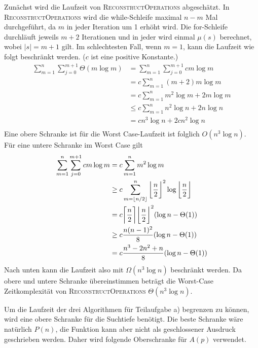 \documentclass[a4paper, 11pt, ngerman]{article}
\begin{document}
Zunächst wird die Laufzeit von \textsc{ReconstructOperations} abgeschätzt. In \textsc{ReconstructOperations} wird die while-Schleife maximal $n - m$ Mal durchgeführt, da $m$ in jeder Iteration um 1 erhöht wird. Die for-Schleife durchläuft jeweils $m + 2$ Iterationen und in jeder wird einmal $\mu(s)$ berechnet, wobei $|s| = m+1$ gilt. Im schlechtesten Fall, wenn $m = 1$, kann die Laufzeit wie folgt beschränkt werden. ($c$ ist eine positive Konstante.)
\begin{align*}
    \sum_{m = 1}^n \sum_{j = 0}^{m+1} \Theta(m \log m)
     & = \sum_{m = 1}^n \sum_{j = 0}^{m+1} cm \log m \\
     & = c \sum_{m = 1}^n (m + 2)m \log m            \\
     & = c \sum_{m = 1}^n m^2 \log m + 2 m \log m    \\
     & \le c \sum_{m = 1}^n n^2 \log n  + 2 n \log n \\
     & = cn^3 \log n + 2cn^2 \log n                  \\
\end{align*}
Eine obere Schranke ist für die Worst Case-Laufzeit ist folglich $O(n^3 \log n)$. Für eine untere Schranke im Worst Case gilt
\begin{align*}
    \sum_{m = 1}^n \sum_{j = 0}^{m+1} cm \log m
     & = c \sum_{m = 1}^n m^2 \log m                                                                                                          \\
     & \ge c \sum_{m = \lfloor n / 2 \rfloor}^{n} \bigg{\lfloor} \frac {n} {2} \bigg{\rfloor} ^2 \log \bigg{\lfloor} \frac n 2 \bigg{\rfloor} \\
     & = c \bigg{\lceil} \frac n 2 \bigg{\rceil} \bigg{\lfloor} \frac n 2 \bigg{\rfloor} ^2 (\log n - \Theta (1))                             \\
     & \ge c \frac {n(n - 1)^2}  8 (\log n - \Theta (1))                                                                                      \\
     & = c \frac {n^3 - 2n^2 + n} 8 (\log n - \Theta (1))
\end{align*}
Nach unten kann die Laufzeit also mit $\Omega(n^3 \log n)$ beschränkt werden. Da obere und untere Schranke übereinstimmen beträgt die Worst-Case Zeitkomplexität von \textsc{ReconstructOperations} $\Theta(n^3 \log n)$.

Um die Laufzeit der drei Algorithmen für Teilaufgabe a) begrenzen zu können, wird eine obere Schranke für die Suchtiefe benötigt. Die beste Schranke wäre natürlich $P(n)$, die Funktion kann aber nicht als geschlossener Ausdruck geschrieben werden. Daher wird folgende Oberschranke für $A(p)$ verwendet.
\end{document}
